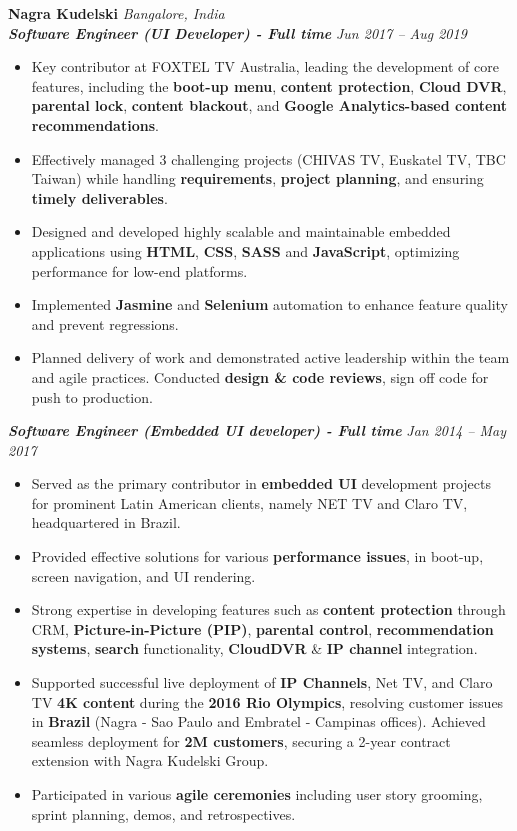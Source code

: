 \documentclass[10pt,a4paper]{article}
\begin{document}
\vspace{3pt}
\noindent\textbf{Nagra Kudelski} \hfill \textit{Bangalore, India} \\
\textit{\textbf{Software Engineer (UI Developer) - Full time}} \hfill \textit{Jun 2017 -- Aug 2019}

\begin{itemize}[leftmargin=1.2em, label=\textopenbullet]
  \item Key contributor at FOXTEL TV Australia, leading the development of core features, including the \textbf{boot-up menu}, \textbf{content protection}, \textbf{Cloud DVR}, \textbf{parental lock}, \textbf{content blackout}, and \textbf{Google Analytics-based content recommendations}.
  \item Effectively managed 3 challenging projects (CHIVAS TV, Euskatel TV, TBC Taiwan) while handling \textbf{requirements}, \textbf{project planning}, and ensuring \textbf{timely deliverables}.
  \item Designed and developed highly scalable and maintainable embedded applications using \textbf{HTML}, \textbf{CSS}, \textbf{SASS} and \textbf{JavaScript}, optimizing performance for low-end platforms.
  \item Implemented \textbf{Jasmine} and \textbf{Selenium} automation to enhance feature quality and prevent regressions.
  \item Planned delivery of work and demonstrated active leadership within the team and agile practices. Conducted \textbf{design \& code reviews}, sign off code for push to production.
\end{itemize}

\vspace{2pt}
\noindent\textit{\textbf{Software Engineer (Embedded UI developer) - Full time}} \hfill \textit{Jan 2014 -- May 2017}

\begin{itemize}[leftmargin=1.2em, label=\textopenbullet]
  \item Served as the primary contributor in \textbf{embedded UI} development projects for prominent Latin American clients, namely NET TV and Claro TV, headquartered in Brazil.
  \item Provided effective solutions for various \textbf{performance issues}, in boot-up, screen navigation, and UI rendering.
  \item Strong expertise in developing features such as \textbf{content protection} through CRM, \textbf{Picture-in-Picture (PIP)}, \textbf{parental control}, \textbf{recommendation systems}, \textbf{search} functionality, \textbf{CloudDVR} \& \textbf{IP channel} integration.
  \item Supported successful live deployment of \textbf{IP Channels}, Net TV, and Claro TV \textbf{4K content} during the \textbf{2016 Rio Olympics}, resolving customer issues in \textbf{Brazil} (Nagra - Sao Paulo and Embratel - Campinas offices). Achieved seamless deployment for \textbf{2M customers}, securing a 2-year contract extension with Nagra Kudelski Group.
  \item Participated in various \textbf{agile ceremonies} including user story grooming, sprint planning, demos, and retrospectives.
\end{itemize}
\end{document}
